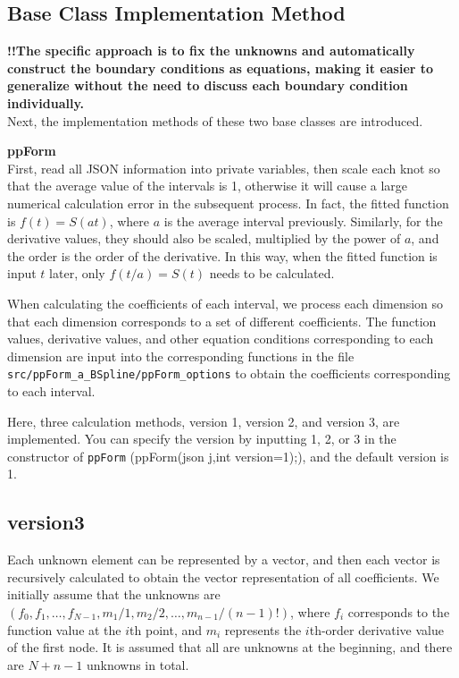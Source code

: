 \documentclass[a4paper]{article}
\begin{document}
\subsection*{Base Class Implementation Method}

\textbf{!!The specific approach is to fix the unknowns and automatically construct the boundary conditions as equations, making it easier to generalize without the need to discuss each boundary condition individually.}
\\
Next, the implementation methods of these two base classes are introduced.

\textbf{ppForm}\\
 First, read all JSON information into private variables, then scale each knot so that the average value of the intervals is 1, otherwise it will cause a large numerical calculation error in the subsequent process. In fact, the fitted function is \(f(t) = S(at)\), where \(a\) is the average interval previously. Similarly, for the derivative values, they should also be scaled, multiplied by the power of \(a\), and the order is the order of the derivative. In this way, when the fitted function is input \(t\) later, only \(f(t/a) = S(t)\) needs to be calculated.

When calculating the coefficients of each interval, we process each dimension so that each dimension corresponds to a set of different coefficients. The function values, derivative values, and other equation conditions corresponding to each dimension are input into the corresponding functions in the file \texttt{src/ppForm\_a\_BSpline/ppForm\_options} to obtain the coefficients corresponding to each interval.

Here, three calculation methods, version 1, version 2, and version 3, are implemented. You can specify the version by inputting 1, 2, or 3 in the constructor of \texttt{ppForm} (ppForm(json j,int version=1);), and the default version is 1.

\subsection*{version3}

Each unknown element can be represented by a vector, and then each vector is recursively calculated to obtain the vector representation of all coefficients. We initially assume that the unknowns are \((f_0, f_1, \dots, f_{N-1}, m_1/1, m_2/2, \dots, m_{n-1}/(n-1)!)\), where \(f_i\) corresponds to the function value at the \(i\)th point, and \(m_i\) represents the \(i\)th-order derivative value of the first node. It is assumed that all are unknowns at the beginning, and there are \(N+n-1\) unknowns in total.
\end{document}
